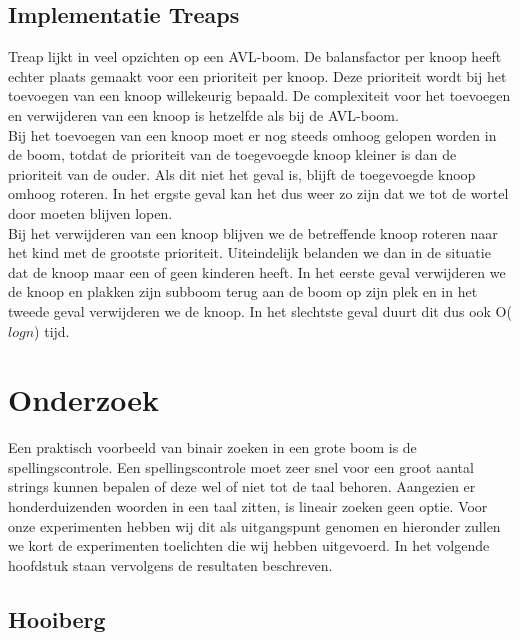 \documentclass[a4paper,10pt]{article}
\begin{document}
\subsection{Implementatie Treaps}
Treap lijkt in veel opzichten op een AVL-boom. De balansfactor per knoop heeft echter plaats gemaakt voor een prioriteit per knoop. Deze prioriteit wordt bij het toevoegen van een knoop willekeurig bepaald. De complexiteit voor het toevoegen en verwijderen van een knoop is hetzelfde als bij de AVL-boom. \\

Bij het toevoegen van een knoop moet er nog steeds omhoog gelopen worden in de boom, totdat de prioriteit van de toegevoegde knoop kleiner is dan de prioriteit van de ouder. Als dit niet het geval is, blijft de toegevoegde knoop omhoog roteren. In het ergste geval kan het dus weer zo zijn dat we tot de wortel door moeten blijven lopen. \\

Bij het verwijderen van een knoop blijven we de betreffende knoop roteren naar het kind met de grootste prioriteit. Uiteindelijk belanden we dan in de situatie dat de knoop maar een of geen kinderen heeft.
In het eerste geval verwijderen we de knoop en plakken zijn subboom terug aan de boom op zijn plek en in het tweede geval verwijderen we de knoop. In het slechtste geval duurt dit dus ook O($logn$) tijd.
\section{Onderzoek}

Een praktisch voorbeeld van binair zoeken in een grote boom is de spellingscontrole. Een spellingscontrole moet zeer snel voor een groot aantal strings kunnen bepalen of deze wel of niet tot de taal behoren. Aangezien er honderduizenden woorden in een taal zitten, is
lineair zoeken geen optie. Voor onze experimenten hebben wij dit als uitgangspunt genomen en hieronder zullen we kort de experimenten toelichten die wij hebben uitgevoerd. In het volgende hoofdstuk staan vervolgens de resultaten beschreven.

\subsection{Hooiberg}
\end{document}

